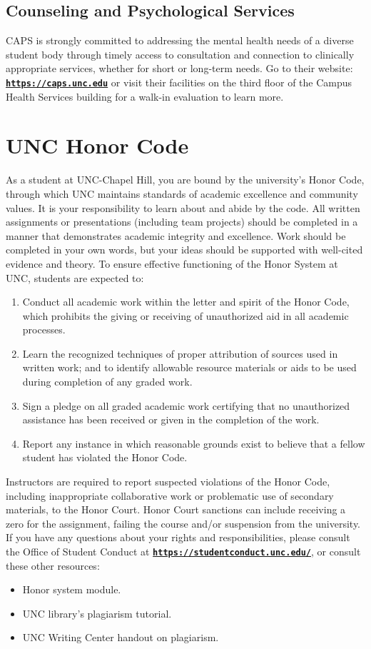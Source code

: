 \documentclass[11pt]{article}
\begin{document}
\subsection*{Counseling and Psychological Services}
CAPS is strongly committed to addressing the mental health needs of a diverse student body through timely access to consultation and connection to clinically appropriate services, whether for short or long-term needs. Go to their website: \href{https://caps.unc.edu}{\tt\bf https://caps.unc.edu} or visit their facilities on the third floor of the Campus Health Services building for a walk-in evaluation to learn more. 

\section*{UNC Honor Code}
As a student at UNC-Chapel Hill, you are bound by the university’s Honor Code, through which UNC maintains standards of academic excellence and community values. It is your responsibility to learn about and abide by the code.  All written assignments or presentations (including team projects) should be completed in a manner that demonstrates academic integrity and excellence. Work should be  completed in your own words, but your ideas should be supported with well-cited evidence and theory.  To ensure effective functioning of the Honor System at UNC, students are expected to: 
\begin{enumerate}
\item Conduct all academic work within the letter and spirit of the Honor Code, which prohibits the giving or receiving of unauthorized aid in all academic processes. 
\item Learn the recognized techniques of proper attribution of sources used in written work; and to identify allowable resource materials or aids to be used during completion of any graded work. 
\item Sign a pledge on all graded academic work certifying that no 
unauthorized assistance has been received or given in the completion of the work. 
\item Report any instance in which reasonable grounds exist to believe that a fellow student has violated the Honor Code.  
\end{enumerate}
Instructors are required to report suspected violations of the Honor Code, including inappropriate collaborative work or problematic use of secondary materials, to the Honor Court. Honor Court sanctions can include receiving a zero for the assignment, failing the course and/or suspension from the university.  If you have any questions about your rights and responsibilities, please consult the Office of Student Conduct at \href{https://studentconduct.unc.edu/}{\tt\bf https://studentconduct.unc.edu/}, or consult these other resources: 
\begin{itemize}
\item Honor system module. 
\item UNC library’s plagiarism tutorial. 
\item UNC Writing Center handout on plagiarism. 
\end{itemize}
\end{document}
